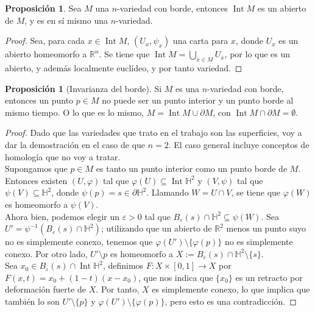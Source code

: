 \documentclass[10pt]{report}
\newcommand{\R}{\mathbb{R}}
\DeclareMathOperator{\interior}{Int} %
\theoremstyle{definition}
\newtheorem{prop}[defin]{Proposición}
\begin{document}
\begin{prop}\label{prop:int_variedad}%
Sea $M$ una $n$-variedad con borde, entonces $\interior{M}$ es un abierto de $M$, y es en sí mismo una $n$-variedad.
\end{prop}
\begin{proof}
Sea, para cada $x\in \interior{M}$, $(U_x,\psi_x)$ una carta para $x$, donde $U_x$ es un abierto homeomorfo a $\R^n$. Se tiene que $\interior{M}=\bigcup_{x\in M} U_x$, por lo que es un abierto, y además localmente euclídeo, y por tanto variedad.
\end{proof}
\begin{prop}[Invarianza del borde]%
Si $M$ es una $n$-variedad con borde, entonces un punto $p\in M$ no puede ser un punto interior y un punto borde al mismo tiempo. O lo que es lo mismo, $M=\interior{M} \cup \partial M$, con $\interior{M} \cap \partial M=\emptyset$.
\end{prop}
\begin{proof}
Dado que las variedades que trato en el trabajo son las superficies, voy a dar la demostración en el caso de que $n=2$. El caso general incluye conceptos de homología que no voy a tratar.\\
Supongamos que $p\in M$ es tanto un punto interior como un punto borde de $M$. Entonces existen $(U,\varphi)$ tal que $\varphi (U)\subseteq \interior{\mathbb{H}^2}$ y $(V,\psi)$ tal que $\psi (V)\subseteq \mathbb{H}^2$, donde $\psi (p)=s\in \partial \mathbb{H}^2$. Llamando $W=U\cap V$, se tiene que $\varphi (W)$ es homeomorfo a $\psi (V)$. \\
Ahora bien, podemos elegir un $\varepsilon >0$ tal que $B_{\varepsilon}(s)\cap \mathbb{H}^2 \subseteq \psi (W)$. Sea $U'=\psi^{-1}\left( B_{\varepsilon}(s) \cap \mathbb{H}^2\right)$; utilizando que un abierto de $\R^2$ menos un punto suyo no es simplemente conexo, tenemos que $\varphi (U')\setminus \{\varphi (p) \}$ no es simplemente conexo. Por otro lado, $U'\setminus {p}$ es homeomorfo a $X:=B_{\varepsilon}(s)\cap \mathbb{H}^2 \setminus \{ s\}$.\\
Sea $x_0\in B_{\varepsilon}(s)\cap \interior{\mathbb{H}^2}$, definimos $F: X\times \left[ 0,1\right] \to X$ por $F(x,t)=x_0 + (1-t)(x-x_0)$, que nos indica que $\{x_0\}$ es un retracto por deformación fuerte de $X$. Por tanto, $X$ es simplemente conexo, lo que implica que también lo son $U'\setminus \{p\}$ y $\varphi(U')\setminus \{ \varphi (p)\}$, pero esto es una contradicción.
\end{proof}
\end{document}
